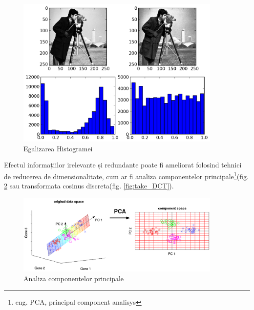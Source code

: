 \begin{figure}[H]
	\includegraphics[width=0.90\textwidth]{imagini/HistogramEqualization-1.png}
	\caption{Egalizarea Histogramei}
	\label{fig:egalizarea_histogrameis}
\end{figure}


Efectul informațiilor irelevante și redundante poate fi ameliorat folosind tehnici de reducerea de dimensionalitate, cum ar fi analiza componentelor principale\footnote{eng. PCA, principal component analisys}(fig. \ref{fig:fig_pca_principal_component_analysis} sau transformata cosinus discreta(fig. \ref{fig:take_DCT}).

\begin{figure}[H]
	\centering
		\includegraphics[width=0.90\textwidth]{imagini/fig_pca_principal_component_analysis.png}
	\caption{Analiza componentelor principale}
	\label{fig:fig_pca_principal_component_analysis}
\end{figure}

